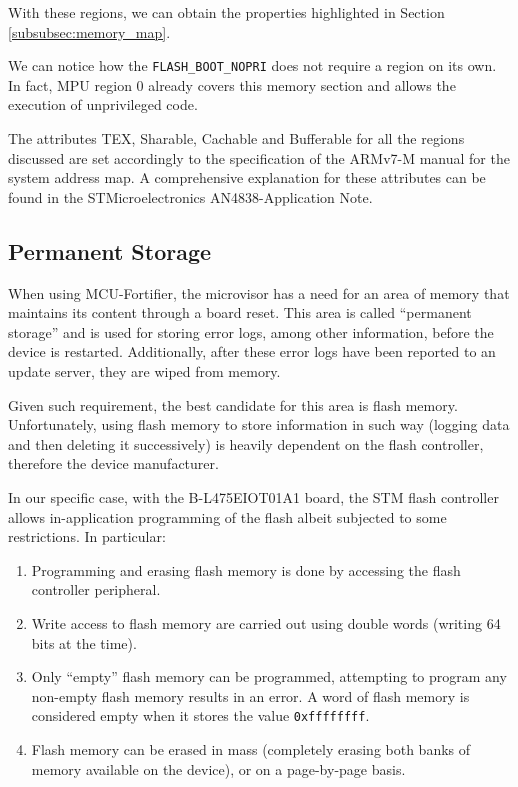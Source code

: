 \documentclass{article}
\begin{document}
With these regions, we can obtain the properties highlighted in Section \ref{subsubsec:memory_map}.

We can notice how the \verb|FLASH_BOOT_NOPRI| does not require a region on its own. In fact, MPU region 0 already covers this memory section and allows the execution of unprivileged code.

The attributes TEX, Sharable, Cachable and Bufferable for all the regions discussed are set accordingly to the specification of the ARMv7-M manual for the system address map\cite{armv7m}. A comprehensive explanation for these attributes can be found in the STMicroelectronics AN4838-Application Note\cite{an4838}.

\subsection{Permanent Storage}
\label{subsec:permanent_storage}
When using MCU-Fortifier, the microvisor has a need for an area of memory that maintains its content through a board reset. This area is called ``permanent storage'' and is used for storing error logs, among other information, before the device is restarted. Additionally, after these error logs have been reported to an update server, they are wiped from memory.

Given such requirement, the best candidate for this area is flash memory. Unfortunately, using flash memory to store information in such way (logging data and then deleting it successively) is heavily dependent on the flash controller, therefore the device manufacturer.

In our specific case, with the B-L475EIOT01A1 board, the STM flash controller allows in-application programming of the flash albeit subjected to some restrictions. In particular:
\begin{enumerate}
	\item Programming and erasing flash memory is done by accessing the flash controller peripheral.
	\item Write access to flash memory are carried out using double words (writing 64 bits at the time).
	\item Only ``empty'' flash memory can be programmed, attempting to program any non-empty flash memory results in an error. A word of flash memory is considered empty when it stores the value \verb|0xffffffff|.
	\item Flash memory can be erased in mass (completely erasing both banks of memory available on the device), or on a page-by-page basis.
\end{enumerate}
\end{document}
